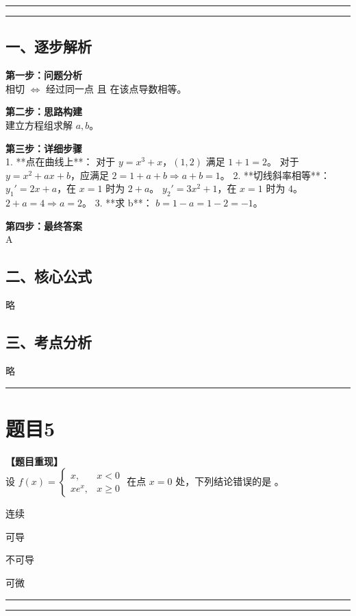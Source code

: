 \documentclass[12pt, a4paper]{ctexart}
\newcommand{\TopSeparator}{
    \par\noindent\rule{\textwidth}{1.5pt}\vspace{0.5em} %
}
\newcommand{\AnalysisSeparator}{
    \par\noindent\rule{\textwidth}{0.5pt}\vspace{0.2em}\hrule\vspace{0.5em} %
}
\newenvironment{RedAnalysis}{
    \par
    \color{red} %
}{
    \par
    \color{black} %
}
\newcommand{\choicesFour}[4]{
    \begin{enumerate}[label=\Alph*., itemsep=0pt, parsep=0pt, topsep=5pt, labelsep=0.5em]
        \begin{minipage}{0.22\linewidth} \item #1 \end{minipage}
        \begin{minipage}{0.22\linewidth} \item #2 \end{minipage}
        \begin{minipage}{0.22\linewidth} \item #3 \end{minipage}
        \begin{minipage}{0.22\linewidth} \item #4 \end{minipage}
    \end{enumerate}
}
\begin{document}
\AnalysisSeparator

\begin{RedAnalysis}

\subsection*{一、逐步解析}

\textbf{第一步：问题分析} \\
相切 $\iff$ 经过同一点 且 在该点导数相等。

\textbf{第二步：思路构建} \\
建立方程组求解 $a, b$。

\textbf{第三步：详细步骤} \\
1. **点在曲线上**：
   对于 $y=x^3+x$，$(1,2)$ 满足 $1+1=2$。
   对于 $y=x^2+ax+b$，应满足 $2 = 1 + a + b \Rightarrow a+b=1$。
2. **切线斜率相等**：
   $y_1' = 2x+a$，在 $x=1$ 时为 $2+a$。
   $y_2' = 3x^2+1$，在 $x=1$ 时为 $4$。
   $2+a = 4 \Rightarrow a=2$。
3. **求 b**：
   $b = 1-a = 1-2 = -1$。

\textbf{第四步：最终答案} \\
A

\subsection*{二、核心公式}
略

\subsection*{三、考点分析}
略

\end{RedAnalysis}

\vspace{2em}

\TopSeparator
\section*{题目5}

\textbf{【题目重现】} \\
设 $ f(x)=\begin{cases}x, & x<0\\ xe^{x}, & x\geq0\end{cases} $ 在点 $x=0$ 处，下列结论错误的是 \underline{\hspace{1cm}}。
\choicesFour{连续}{可导}{不可导}{可微}

\AnalysisSeparator
\end{document}
